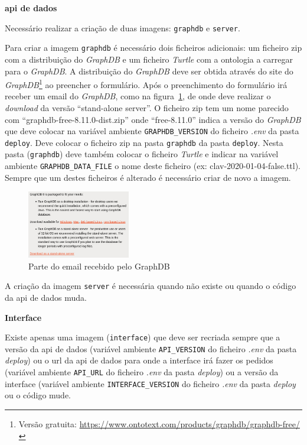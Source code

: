 \begin{description}
    \item \textbf{\acrshort{api} de dados}

    Necessário realizar a criação de duas imagens: \texttt{graphdb} e \texttt{server}.

    Para criar a imagem \texttt{graphdb} é necessário dois ficheiros adicionais: um ficheiro zip com a distribuição do \textit{GraphDB} e um ficheiro \textit{Turtle} com a ontologia a carregar para o \textit{GraphDB}. A distribuição do \textit{GraphDB} deve ser obtida através do site do \textit{GraphDB}\footnote{Versão gratuita: \url{https://www.ontotext.com/products/graphdb/graphdb-free/}} ao preencher o formulário. Após o preenchimento do formulário irá receber um email do \textit{GraphDB}, como na figura~\ref{fig:graphdb_email}, de onde deve realizar o \textit{download} da versão ``stand-alone server''. O ficheiro zip tem um nome parecido com ``graphdb-free-8.11.0-dist.zip'' onde ``free-8.11.0'' indica a versão do \textit{GraphDB} que deve colocar na variável ambiente \texttt{GRAPHDB\_VERSION} do ficheiro \textit{.env} da pasta \texttt{deploy}. Deve colocar o ficheiro zip na pasta \texttt{graphdb} da pasta \texttt{deploy}. Nesta pasta (\texttt{graphdb}) deve também colocar o ficheiro \textit{Turtle} e indicar na variável ambiente \texttt{GRAPHDB\_DATA\_FILE} o nome deste ficheiro (ex: clav-2020-01-04-false.ttl). Sempre que um destes ficheiros é alterado é necessário criar de novo a imagem.

    \begin{figure}[H]
        \centering
        \includegraphics[width=0.4\textwidth]{img/graphdb_email.png}
        \caption{Parte do email recebido pelo GraphDB\label{fig:instalacao-email}\label{fig:graphdb_email}}
    \end{figure}

    A criação da imagem \texttt{server} é necessária quando não existe ou quando o código da \acrshort{api} de dados muda.

    \item \textbf{Interface}

    Existe apenas uma imagem (\texttt{interface}) que deve ser recriada sempre que a versão da \acrshort{api} de dados (variável ambiente \texttt{API\_VERSION} do ficheiro \textit{.env} da pasta \textit{deploy}) ou o \acrshort{url} da \acrshort{api} de dados para onde a interface irá fazer os pedidos (variável ambiente \texttt{API\_URL} do ficheiro \textit{.env} da pasta \textit{deploy}) ou a versão da interface (variável ambiente \texttt{INTERFACE\_VERSION} do ficheiro \textit{.env} da pasta \textit{deploy} ou o código mude.
\end{description}

